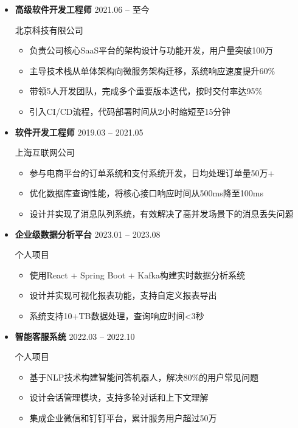\documentclass[11pt,a4paper]{article}
\begin{document}
\begin{itemize}
    \item \textbf{高级软件开发工程师} \hfill 2021.06 -- 至今

    \textcolor{primarycolor}{北京科技有限公司}

    \begin{itemize}
        \item 负责公司核心SaaS平台的架构设计与功能开发，用户量突破100万
        \item 主导技术栈从单体架构向微服务架构迁移，系统响应速度提升60\%
        \item 带领5人开发团队，完成多个重要版本迭代，按时交付率达95\%
        \item 引入CI/CD流程，代码部署时间从2小时缩短至15分钟
    \end{itemize}

    \vspace{0.15em}

    \item \textbf{软件开发工程师} \hfill 2019.03 -- 2021.05

    \textcolor{primarycolor}{上海互联网公司}

    \begin{itemize}
        \item 参与电商平台的订单系统和支付系统开发，日均处理订单量50万+
        \item 优化数据库查询性能，将核心接口响应时间从500ms降至100ms
        \item 设计并实现了消息队列系统，有效解决了高并发场景下的消息丢失问题
    \end{itemize}

    \vspace{0.15em}

    \item \textbf{企业级数据分析平台} \hfill 2023.01 -- 2023.08

    \textcolor{primarycolor}{个人项目}

    \begin{itemize}
        \item 使用React + Spring Boot + Kafka构建实时数据分析系统
        \item 设计并实现可视化报表功能，支持自定义报表导出
        \item 系统支持10+TB数据处理，查询响应时间<3秒
    \end{itemize}

    \vspace{0.15em}

    \item \textbf{智能客服系统} \hfill 2022.03 -- 2022.10

    \textcolor{primarycolor}{个人项目}

    \begin{itemize}
        \item 基于NLP技术构建智能问答机器人，解决80\%的用户常见问题
        \item 设计会话管理模块，支持多轮对话和上下文理解
        \item 集成企业微信和钉钉平台，累计服务用户超过50万
    \end{itemize}
\end{itemize}
\end{document}
